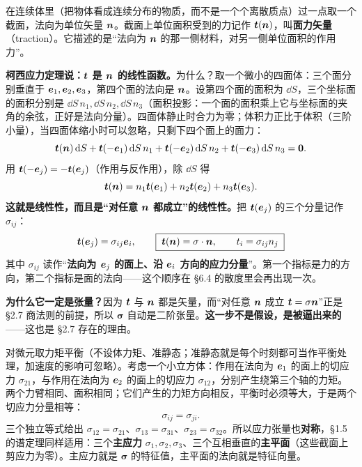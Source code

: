 \documentclass[11pt]{ctexart}
\newcommand{\ten}[1]{\mathbf{#1}}
\let\orighdr\hdr
\renewcommand{\hdr}[2]{\par\needspace{5\baselineskip}\orighdr{#1}{#2}}
\let\origsubhdr\subhdr
\renewcommand{\subhdr}[1]{\par\needspace{3\baselineskip}\origsubhdr{#1}}
\begin{document}


在连续体里（把物体看成连续分布的物质，而不是一个个离散质点）过一点取一个截面，法向为单位矢量 $\boldsymbol{n}$。截面上单位面积受到的力记作 $\boldsymbol{t}(\boldsymbol{n})$，叫\textbf{面力矢量}（traction）。它描述的是“法向为 $\boldsymbol{n}$ 的那一侧材料，对另一侧单位面积的作用力”。

\textbf{柯西应力定理说：$\boldsymbol{t}$ 是 $\boldsymbol{n}$ 的线性函数。}为什么？取一个微小的四面体：三个面分别垂直于 $\boldsymbol{e}_1,\boldsymbol{e}_2,\boldsymbol{e}_3$，第四个面的法向是 $\boldsymbol{n}$。设第四个面的面积为 $\dd S$，三个坐标面的面积分别是 $\dd S\,n_1,\dd S\,n_2,\dd S\,n_3$（面积投影：一个面的面积乘上它与坐标面的夹角的余弦，正好是法向分量）。四面体静止时合力为零；体积力正比于体积（三阶小量），当四面体缩小时可以忽略，只剩下四个面上的面力：
\[
\boldsymbol{t}(\boldsymbol{n})\,\mathrm{d} S+\boldsymbol{t}(-\boldsymbol{e}_1)\,\mathrm{d} S\,n_1+\boldsymbol{t}(-\boldsymbol{e}_2)\,\mathrm{d} S\,n_2+\boldsymbol{t}(-\boldsymbol{e}_3)\,\mathrm{d} S\,n_3=\boldsymbol{0} .
\]
用 $\boldsymbol{t}(-\boldsymbol{e}_j)=-\boldsymbol{t}(\boldsymbol{e}_j)$（作用与反作用），除 $\dd S$ 得
\[
\boldsymbol{t}(\boldsymbol{n})=n_1\boldsymbol{t}(\boldsymbol{e}_1)+n_2\boldsymbol{t}(\boldsymbol{e}_2)+n_3\boldsymbol{t}(\boldsymbol{e}_3).
\]
\textbf{这就是线性性，而且是“对任意 $\boldsymbol{n}$ 都成立”的线性性。}把 $\boldsymbol{t}(\boldsymbol{e}_j)$ 的三个分量记作 $\sigma_{ij}$：
\[
\vect t(\vect e_j)=\sigma_{ij}\vect e_i,
\qquad
\boxed{\;\vect t(\vect n)=\ten\sigma\cdot\vect n,\qquad t_i=\sigma_{ij}n_j\;}
\]
其中 $\sigma_{ij}$ 读作“\textbf{法向为 $\boldsymbol{e}_j$ 的面上、沿 $\boldsymbol{e}_i$ 方向的应力分量}”。第一个指标是力的方向，第二个指标是面的法向——这个顺序在 §6.4 的散度里会再出现一次。

\textbf{为什么它一定是张量？}因为 $\boldsymbol{t}$ 与 $\boldsymbol{n}$ 都是矢量，而“对任意 $\boldsymbol{n}$ 成立 $\vect t=\ten\sigma\vect n$”正是 §2.7 商法则的前提，所以 $\ten\sigma$ 自动是二阶张量。\textbf{这一步不是假设，是被逼出来的}——这也是 §2.7 存在的理由。


对微元取力矩平衡（不设体力矩、准静态；准静态就是每个时刻都可当作平衡处理，加速度的影响可忽略）。考虑一个小立方体：作用在法向为 $\boldsymbol{e}_1$ 的面上的切应力 $\sigma_{21}$，与作用在法向为 $\boldsymbol{e}_2$ 的面上的切应力 $\sigma_{12}$，分别产生绕第三个轴的力矩。两个力臂相同、面积相同；它们产生的力矩方向相反，平衡时必须等大，于是两个切应力分量相等：
\[
\sigma_{ij}=\sigma_{ji}.
\]
三个独立等式给出 $\sigma_{12}=\sigma_{21}$、$\sigma_{13}=\sigma_{31}$、$\sigma_{23}=\sigma_{32}$。所以应力张量也\textbf{对称}，§1.5 的谱定理同样适用：三个\textbf{主应力} $\sigma_1,\sigma_2,\sigma_3$、三个互相垂直的\textbf{主平面}（这些截面上剪应力为零）。主应力就是 $\ten\sigma$ 的特征值，主平面的法向就是特征向量。
\end{document}
